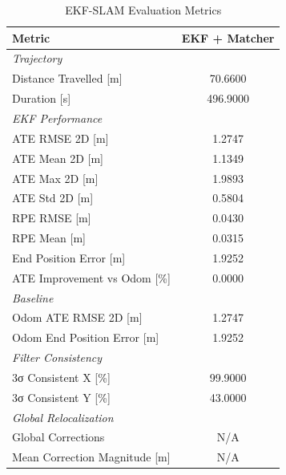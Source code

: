 \begin{table}[htbp]
\centering
\caption{EKF-SLAM Evaluation Metrics}
\label{tab:ekf_results}
\begin{tabular}{lc}
\toprule
Metric & \textbf{EKF + Matcher} \\
\midrule
\multicolumn{2}{l}{\textit{Trajectory}} \\
Distance Travelled [m] & 70.6600 \\
Duration [s] & 496.9000 \\
\midrule
\multicolumn{2}{l}{\textit{EKF Performance}} \\
ATE RMSE 2D [m] & 1.2747 \\
ATE Mean 2D [m] & 1.1349 \\
ATE Max 2D [m] & 1.9893 \\
ATE Std 2D [m] & 0.5804 \\
RPE RMSE [m] & 0.0430 \\
RPE Mean [m] & 0.0315 \\
End Position Error [m] & 1.9252 \\
ATE Improvement vs Odom [\%] & 0.0000 \\
\midrule
\multicolumn{2}{l}{\textit{Baseline}} \\
Odom ATE RMSE 2D [m] & 1.2747 \\
Odom End Position Error [m] & 1.9252 \\
\midrule
\multicolumn{2}{l}{\textit{Filter Consistency}} \\
3σ Consistent X [\%] & 99.9000 \\
3σ Consistent Y [\%] & 43.0000 \\
\midrule
\multicolumn{2}{l}{\textit{Global Relocalization}} \\
Global Corrections & N/A \\
Mean Correction Magnitude [m] & N/A \\
\midrule
\bottomrule
\end{tabular}
\end{table}